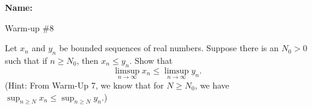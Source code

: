 \documentclass[12pt]{article}
\begin{document}
\noindent \textbf{Name:} 

\begin{center}
Warm-up \#8
\end{center}

\noindent Let $x_n$ and $y_n$ be bounded sequences of real numbers. Suppose there is an $N_0 > 0$ such that if $n \geqslant N_0$, then $x_n \leqslant y_n$. Show that 
\[
\limsup_{n \to \infty}x_n \leqslant \limsup_{n \to \infty}y_n.
\]
(Hint: From Warm-Up 7, we know that for $N \geqslant N_0$, we have $\sup_{n \geqslant N}x_n \leqslant \sup_{n \geqslant N}y_n$.)
\end{document}
